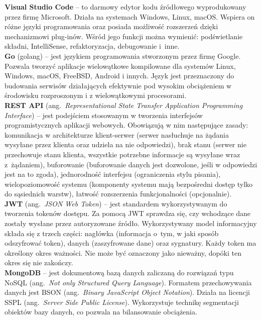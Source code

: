 \noindent\textbf{Visual Studio Code} -- to darmowy edytor kodu źródłowego wyprodukowany przez firmę Microsoft. Działa na systemach Windows, Linux, macOS. Wspiera on różne języki programowania oraz posiada możliwość rozszerzeń dzięki mechanizmowi plug-inów. Wśród jego funkcji można wymienić: podświetlanie składni, IntelliSense, refaktoryzacja, debugowanie i~inne.~\cite{vscode} \\

\noindent\textbf{Go} (golang) -- jest językiem programowania stworzonym przez firmę Google. Pozwala tworzyć aplikacje wielowątkowe kompilowane dla systemów Linux, Windows, macOS, FreeBSD, Android i innych. Język jest przeznaczony do budowania serwisów działających efektywnie pod wysokim obciążeniem w środowisku rozproszonym i z wielowątkowymi procesorami.~\cite{golang1,golang2,golang3,godoc} \\

\noindent\textbf{REST API} (ang.~\emph{Representational State Transfer Application Programming Interface}) -- jest podejściem stosowanym w tworzenia interfejsów programistycznych aplikacji webowych. Obowiązują w nim następujące zasady: komunikacja w architekturze klient-serwer (serwer nasłuchuje na żądania wysyłane przez klienta oraz udziela na nie odpowiedzi), brak stanu (serwer nie przechowuje stanu klienta, wszystkie potrzebne informacje są wysyłane wraz z~żądaniem), buforowanie (buforowanie danych jest dozwolone, jeśli w odpowiedzi jest na to zgoda), jednorodność interfejsu (ograniczenia stylu pisania), wielopoziomowość systemu (komponenty systemu mają bezpośredni dostęp tylko do sąsiednich warstw), łatwość rozszerzenia funkcjonalności (opcjonalnie).  \cite{rest_api,rest_api_best} \\

\noindent\textbf{JWT} (ang.~\emph{JSON Web Token}) -- jest standardem wykorzystywanym do tworzenia tokenów dostępu. Za pomocą JWT sprawdza się, czy wchodzące dane zostały wysłane przez autoryzowane źródło. Wykorzystywany model informacyjny składa się z trzech części: nagłówka (informacja o~tym, w jaki sposób odszyfrować token), danych (zaszyfrowane dane) oraz sygnatury. Każdy token ma określony okres ważności. Nie może być oznaczony jako nieważny, dopóki ten okres się nie zakończy.~\cite{jwt} \\

\noindent\textbf{MongoDB} -- jest dokumentową bazą danych zaliczaną do rozwiązań typu NoSQL (ang.~\emph{Not only Structured Query Language}). Formatem przechowywania danych jest BSON (ang.~\emph{Binary JavaScript Object Notation}). Działa na licencji SSPL (ang.~\emph{Server Side Public License}). Wykorzystuje technikę segmentacji obiektów bazy danych, co pozwala na bilansowanie obciążenia.~\cite{mongoDB,mongoDB_doc,mongodb_habr} \\

